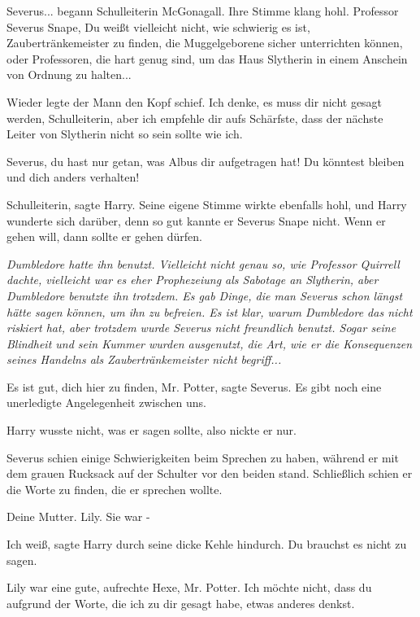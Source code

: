 \glqq{}Severus...\grqq{} begann Schulleiterin McGonagall. Ihre Stimme klang hohl.
\glqq{}Professor Severus Snape, Du weißt vielleicht nicht, wie schwierig es ist,
Zaubertränkemeister zu finden, die Muggelgeborene sicher unterrichten können,
oder Professoren, die hart genug sind, um das Haus Slytherin in einem Anschein
von Ordnung zu halten...\grqq{}

Wieder legte der Mann den Kopf schief. \glqq{}Ich denke, es muss dir nicht gesagt
werden, Schulleiterin, aber ich empfehle dir aufs Schärfste, dass der nächste
Leiter von Slytherin nicht so sein sollte wie ich.\grqq{}

\glqq{}Severus, du hast nur getan, was Albus dir aufgetragen hat! Du könntest
bleiben und dich anders verhalten!\grqq{}

\glqq{}Schulleiterin\grqq{}, sagte Harry. Seine eigene Stimme wirkte ebenfalls
hohl, und Harry wunderte sich darüber, denn so gut kannte er Severus Snape
nicht. \glqq{}Wenn er gehen will, dann sollte er gehen dürfen.\grqq{}

\emph{Dumbledore hatte ihn benutzt. Vielleicht nicht genau so, wie Professor
Quirrell dachte, vielleicht war es eher Prophezeiung als Sabotage an Slytherin,
aber Dumbledore benutzte ihn trotzdem. Es gab Dinge, die man Severus schon
längst hätte sagen können, um ihn zu befreien. Es ist klar, warum Dumbledore das
nicht riskiert hat, aber trotzdem wurde Severus nicht freundlich benutzt. Sogar
seine Blindheit und sein Kummer wurden ausgenutzt, die Art, wie er die
Konsequenzen seines Handelns als Zaubertränkemeister nicht begriff...}

\glqq{}Es ist gut, dich hier zu finden, Mr. Potter\grqq{}, sagte Severus. \glqq{}
Es gibt noch eine unerledigte Angelegenheit zwischen uns.\grqq{}

Harry wusste nicht, was er sagen sollte, also nickte er nur.

Severus schien einige Schwierigkeiten beim Sprechen zu haben, während er mit dem
grauen Rucksack auf der Schulter vor den beiden stand. Schließlich schien er die
Worte zu finden, die er sprechen wollte.

\glqq{}Deine Mutter. Lily. Sie war -\grqq{}

\glqq{}Ich weiß\grqq{}, sagte Harry durch seine dicke Kehle hindurch. \glqq{}Du
brauchst es nicht zu sagen.\grqq{}

\glqq{}Lily war eine gute, aufrechte Hexe, Mr. Potter. Ich möchte nicht, dass du
aufgrund der Worte, die ich zu dir gesagt habe, etwas anderes denkst.\grqq{}

